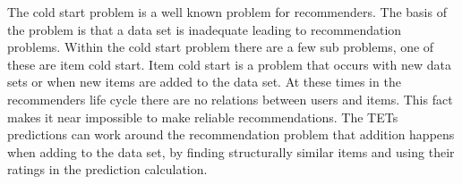 The cold start problem is a well known problem for recommenders\cite{Ricci2015}\cite{saveski2014item}.
The basis of the problem is that a data set is 
inadequate leading to recommendation problems.
Within the cold start problem there are a few sub problems, one of these are item cold start.
Item cold start is a problem that occurs with new data sets or when new items are added to the data set.
At these times in the recommenders life cycle there are no relations between users and items.
This fact makes it near impossible to make reliable recommendations.
The TETs predictions can work around the recommendation problem that addition happens when adding to the data set, by finding structurally similar items and using their ratings in the prediction calculation.
